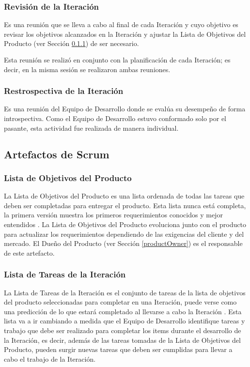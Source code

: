 \subsubsection{Revisión de la Iteración}
Es una reunión que se lleva a cabo al final de cada Iteración y cuyo objetivo es revisar los objetivos alcanzados en la Iteración y ajustar la Lista de Objetivos del Producto (ver Sección \ref{productBacklog}) de ser necesario.

Esta reunión se realizó en conjunto con la planificación de cada Iteración; es decir, en la misma sesión se realizaron ambas reuniones.

\subsubsection{Restrospectiva de la Iteración}
Es una reunión del Equipo de Desarrollo donde se evalúa su desempeño de forma introspectiva. Como el Equipo de Desarrollo estuvo conformado solo por el pasante, esta actividad fue realizada de manera individual.


\subsection{Artefactos de Scrum}
\subsubsection{Lista de Objetivos del Producto} \label{productBacklog}
La Lista de Objetivos del Producto es una lista ordenada de todas las tareas que deben ser completadas para entregar el producto. Esta lista nunca está completa, la primera versión muestra los primeros requerimientos conocidos y mejor entendidos \cite{scrumSchwaber}. La Lista de Objetivos del Producto evoluciona junto con el producto para actualizar los requerimientos dependiendo de las exigencias del cliente y del mercado. El Dueño del Producto (ver Sección \ref{productOwner}) es el responsable de este artefacto.

\subsubsection{Lista de Tareas de la Iteración}
La Lista de Tareas de la Iteración es el conjunto de tareas de la lista de objetivos del producto seleccionadas para completar en una Iteración, puede verse como una predicción de lo que estará completado al llevarse a cabo la Iteración \cite{scrumSchwaber}. Esta lista va a ir cambiando a medida que el Equipo de Desarrollo identifique tareas y trabajo que debe ser realizado para completar los items durante el desarrollo de la Iteración, es decir, además de las tareas tomadas de la Lista de Objetivos del Producto, pueden surgir nuevas tareas que deben ser cumplidas para llevar a cabo el trabajo de la Iteración.

